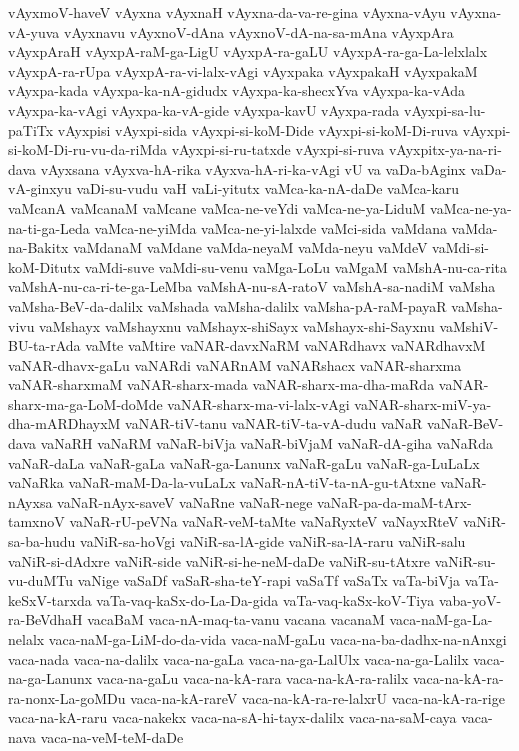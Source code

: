 {vAyxmoV-haveV
vAyxna
vAyxnaH
vAyxna-da-va-re-gina
vAyxna-vAyu
vAyxna-vA-yuva
vAyxnavu
vAyxnoV-dAna
vAyxnoV-dA-na-sa-mAna
vAyxpAra
vAyxpAraH
vAyxpA-raM-ga-LigU
vAyxpA-ra-gaLU
vAyxpA-ra-ga-La-lelxlalx
vAyxpA-ra-rUpa
vAyxpA-ra-vi-lalx-vAgi
vAyxpaka
vAyxpakaH
vAyxpakaM
vAyxpa-kada
vAyxpa-ka-nA-gidudx
vAyxpa-ka-shecxYva
vAyxpa-ka-vAda
vAyxpa-ka-vAgi
vAyxpa-ka-vA-gide
vAyxpa-kavU
vAyxpa-rada
vAyxpi-sa-lu-paTiTx
vAyxpisi
vAyxpi-sida
vAyxpi-si-koM-Dide
vAyxpi-si-koM-Di-ruva
vAyxpi-si-koM-Di-ru-vu-da-riMda
vAyxpi-si-ru-tatxde
vAyxpi-si-ruva
vAyxpitx-ya-na-ri-dava
vAyxsana
vAyxva-hA-rika
vAyxva-hA-ri-ka-vAgi
vU
va
vaDa-bAginx
vaDa-vA-ginxyu
vaDi-su-vudu
vaH
vaLi-yitutx
vaMca-ka-nA-daDe
vaMca-karu
vaMcanA
vaMcanaM
vaMcane
vaMca-ne-veYdi
vaMca-ne-ya-LiduM
vaMca-ne-ya-na-ti-ga-Leda
vaMca-ne-yiMda
vaMca-ne-yi-lalxde
vaMci-sida
vaMdana
vaMda-na-Bakitx
vaMdanaM
vaMdane
vaMda-neyaM
vaMda-neyu
vaMdeV
vaMdi-si-koM-Ditutx
vaMdi-suve
vaMdi-su-venu
vaMga-LoLu
vaMgaM
vaMshA-nu-ca-rita
vaMshA-nu-ca-ri-te-ga-LeMba
vaMshA-nu-sA-ratoV
vaMshA-sa-nadiM
vaMsha
vaMsha-BeV-da-dalilx
vaMshada
vaMsha-dalilx
vaMsha-pA-raM-payaR
vaMsha-vivu
vaMshayx
vaMshayxnu
vaMshayx-shiSayx
vaMshayx-shi-Sayxnu
vaMshiV-BU-ta-rAda
vaMte
vaMtire
vaNAR-davxNaRM
vaNARdhavx
vaNARdhavxM
vaNAR-dhavx-gaLu
vaNARdi
vaNARnAM
vaNARshacx
vaNAR-sharxma
vaNAR-sharxmaM
vaNAR-sharx-mada
vaNAR-sharx-ma-dha-maRda
vaNAR-sharx-ma-ga-LoM-doMde
vaNAR-sharx-ma-vi-lalx-vAgi
vaNAR-sharx-miV-ya-dha-mARDhayxM
vaNAR-tiV-tanu
vaNAR-tiV-ta-vA-dudu
vaNaR
vaNaR-BeV-dava
vaNaRH
vaNaRM
vaNaR-biVja
vaNaR-biVjaM
vaNaR-dA-giha
vaNaRda
vaNaR-daLa
vaNaR-gaLa
vaNaR-ga-Lanunx
vaNaR-gaLu
vaNaR-ga-LuLaLx
vaNaRka
vaNaR-maM-Da-la-vuLaLx
vaNaR-nA-tiV-ta-nA-gu-tAtxne
vaNaR-nAyxsa
vaNaR-nAyx-saveV
vaNaRne
vaNaR-nege
vaNaR-pa-da-maM-tArx-tamxnoV
vaNaR-rU-peVNa
vaNaR-veM-taMte
vaNaRyxteV
vaNayxRteV
vaNiR-sa-ba-hudu
vaNiR-sa-hoVgi
vaNiR-sa-lA-gide
vaNiR-sa-lA-raru
vaNiR-salu
vaNiR-si-dAdxre
vaNiR-side
vaNiR-si-he-neM-daDe
vaNiR-su-tAtxre
vaNiR-su-vu-duMTu
vaNige
vaSaDf
vaSaR-sha-teY-rapi
vaSaTf
vaSaTx
vaTa-biVja
vaTa-keSxV-tarxda
vaTa-vaq-kaSx-do-La-Da-gida
vaTa-vaq-kaSx-koV-Tiya
vaba-yoV-ra-BeVdhaH
vacaBaM
vaca-nA-maq-ta-vanu
vacana
vacanaM
vaca-naM-ga-La-nelalx
vaca-naM-ga-LiM-do-da-vida
vaca-naM-gaLu
vaca-na-ba-dadhx-na-nAnxgi
vaca-nada
vaca-na-dalilx
vaca-na-gaLa
vaca-na-ga-LalUlx
vaca-na-ga-Lalilx
vaca-na-ga-Lanunx
vaca-na-gaLu
vaca-na-kA-rara
vaca-na-kA-ra-ralilx
vaca-na-kA-ra-ra-nonx-La-goMDu
vaca-na-kA-rareV
vaca-na-kA-ra-re-lalxrU
vaca-na-kA-ra-rige
vaca-na-kA-raru
vaca-nakekx
vaca-na-sA-hi-tayx-dalilx
vaca-na-saM-caya
vaca-nava
vaca-na-veM-teM-daDe
}
